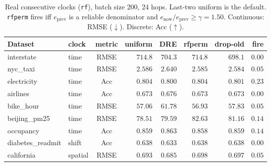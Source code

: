 \begin{table}[ht]\centering
\caption{Real consecutive clocks (\texttt{rf}), batch size 200,
24 hops. Last-two uniform is the default. \texttt{rfperm} fires
iff $e_{\mathrm{prev}}$ is a reliable denominator and $e_{\mathrm{now}}/e_{\mathrm{prev}}\ge\gamma=1.50$.
Continuous: RMSE ($\downarrow$). Discrete: Acc ($\uparrow$).}
\label{tab:po-refit-real-rf}
\small
\setlength{\tabcolsep}{3.2pt}
\begin{tabular}{@{}llcrrrrr@{}}\toprule
Dataset & clock & metric & uniform & DRE & rfperm & drop-old & fire \\
\midrule
interstate & time & RMSE & $714.8$ & $704.3$ & $714.8$ & $\mathbf{698.1}$ & $0.00$ \\
nyc\_taxi & time & RMSE & $2.586$ & $2.640$ & $2.585$ & $\mathbf{2.584}$ & $0.05$ \\
electricity & time & Acc & $\mathbf{0.804}$ & $0.800$ & $\mathbf{0.804}$ & $0.801$ & $0.23$ \\
airlines & time & Acc & $0.673$ & $\mathbf{0.676}$ & $0.673$ & $0.673$ & $0.00$ \\
bike\_hour & time & RMSE & $57.06$ & $61.78$ & $\mathbf{56.93}$ & $57.83$ & $0.05$ \\
beijing\_pm25 & time & RMSE & $\mathbf{78.51}$ & $79.59$ & $82.63$ & $81.16$ & $0.14$ \\
occupancy & time & Acc & $0.859$ & $\mathbf{0.863}$ & $0.858$ & $0.859$ & $0.14$ \\
diabetes\_readmit & shift & Acc & $\mathbf{0.638}$ & $0.633$ & $\mathbf{0.638}$ & $\mathbf{0.638}$ & $0.00$ \\
california & spatial & RMSE & $0.693$ & $\mathbf{0.685}$ & $0.698$ & $0.697$ & $0.05$ \\
\bottomrule
\end{tabular}
\end{table}

